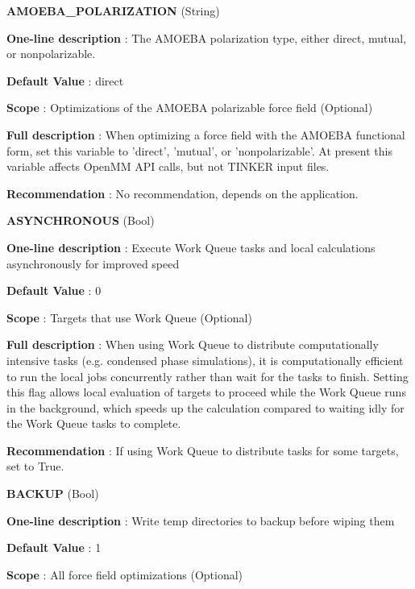 \begin{DoxyItemize}
\item {\bfseries  A\-M\-O\-E\-B\-A\-\_\-\-P\-O\-L\-A\-R\-I\-Z\-A\-T\-I\-O\-N } (String) \par
{\bfseries  One-\/line description }\-: The A\-M\-O\-E\-B\-A polarization type, either direct, mutual, or nonpolarizable. \par
{\bfseries  Default Value }\-: direct \par
{\bfseries  Scope }\-: Optimizations of the A\-M\-O\-E\-B\-A polarizable force field (Optional) \par
{\bfseries  Full description }\-: When optimizing a force field with the A\-M\-O\-E\-B\-A functional form, set this variable to 'direct', 'mutual', or 'nonpolarizable'. At present this variable affects Open\-M\-M A\-P\-I calls, but not T\-I\-N\-K\-E\-R input files. \par
{\bfseries  Recommendation }\-: No recommendation, depends on the application.\end{DoxyItemize}
\begin{DoxyItemize}
\item {\bfseries  A\-S\-Y\-N\-C\-H\-R\-O\-N\-O\-U\-S } (Bool) \par
{\bfseries  One-\/line description }\-: Execute Work Queue tasks and local calculations asynchronously for improved speed \par
{\bfseries  Default Value }\-: 0 \par
{\bfseries  Scope }\-: Targets that use Work Queue (Optional) \par
{\bfseries  Full description }\-: When using Work Queue to distribute computationally intensive tasks (e.\-g. condensed phase simulations), it is computationally efficient to run the local jobs concurrently rather than wait for the tasks to finish. Setting this flag allows local evaluation of targets to proceed while the Work Queue runs in the background, which speeds up the calculation compared to waiting idly for the Work Queue tasks to complete. \par
{\bfseries  Recommendation }\-: If using Work Queue to distribute tasks for some targets, set to True.\end{DoxyItemize}
\begin{DoxyItemize}
\item {\bfseries  B\-A\-C\-K\-U\-P } (Bool) \par
{\bfseries  One-\/line description }\-: Write temp directories to backup before wiping them \par
{\bfseries  Default Value }\-: 1 \par
{\bfseries  Scope }\-: All force field optimizations (Optional)\end{DoxyItemize}
